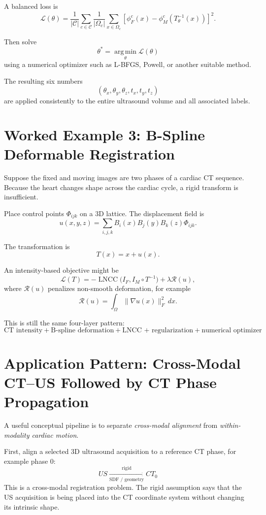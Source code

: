\documentclass[11pt,a4paper]{article}
\newcommand{\Loss}{\mathcal{L}}
\newcommand{\argmin}{\operatorname*{arg\,min}}
\begin{document}
A balanced loss is
\[
\Loss(\theta)
=
\frac{1}{|\mathcal C|}
\sum_{c\in\mathcal C}
\frac{1}{|\Omega_c|}
\sum_{x\in\Omega_c}
\left[
\phi_F^c(x)
-
\phi_M^c(T_\theta^{-1}(x))
\right]^2.
\]

Then solve
\[
\boxed{
\theta^*=\argmin_\theta\Loss(\theta)
}
\]
using a numerical optimizer such as L-BFGS, Powell, or another suitable method.

The resulting six numbers
\[
(\theta_x,\theta_y,\theta_z,t_x,t_y,t_z)
\]
are applied consistently to the entire ultrasound volume and all associated labels.

\section{Worked Example 3: B-Spline Deformable Registration}

Suppose the fixed and moving images are two phases of a cardiac CT sequence. Because the heart changes shape across the cardiac cycle, a rigid transform is insufficient.

Place control points $\Phi_{ijk}$ on a 3D lattice. The displacement field is
\[
 u(x,y,z)
=
\sum_{i,j,k}
B_i(x)B_j(y)B_k(z)\Phi_{ijk}.
\]

The transformation is
\[
T(x)=x+u(x).
\]

An intensity-based objective might be
\[
\Loss(T)
=
-\operatorname{LNCC}\bigl(I_F, I_M\circ T^{-1}\bigr)
+
\lambda\mathcal R(u),
\]
where $\mathcal R(u)$ penalizes non-smooth deformation, for example
\[
\mathcal R(u)
=
\int_\Omega\|\nabla u(x)\|_F^2\,dx.
\]

This is still the same four-layer pattern:
\[
\boxed{
\text{CT intensity}
+
\text{B-spline deformation}
+
\text{LNCC + regularization}
+
\text{numerical optimizer}
}
\]

\section{Application Pattern: Cross-Modal CT--US Followed by CT Phase Propagation}

A useful conceptual pipeline is to separate \emph{cross-modal alignment} from \emph{within-modality cardiac motion}.

First, align a selected 3D ultrasound acquisition to a reference CT phase, for example phase 0:
\[
\boxed{
US
\xrightarrow[\text{SDF / geometry}]{\text{rigid}}
CT_0
}
\]
This is a cross-modal registration problem. The rigid assumption says that the US acquisition is being placed into the CT coordinate system without changing its intrinsic shape.
\end{document}
